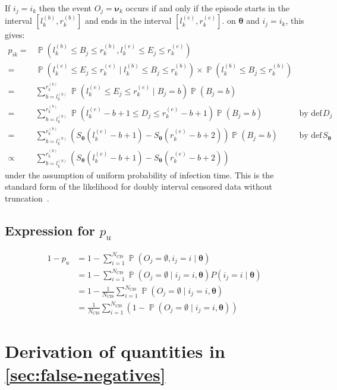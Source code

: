 \documentclass[12pt]{article}
\DeclareMathOperator{\prob}{\mathbb{P}}
\renewcommand{\vec}[1]{\bm{#1}}
\newcommand{\Ncis}{N_\text{CIS}}
\begin{document}
If $i_j = i_k$ then the event $O_j = \vec{\nu}_k$ occurs if and only if the episode starts in the interval $[l^{(b)}_k, r^{(b)}_k]$ and ends in the interval $[l^{(e)}_k, r^{(e)}_k]$.
 on $\vec{\theta}$ and $i_j = i_k$, this gives:
\begin{align}
p_{ik}
=& \prob \left( l_k^{(b)} \leq B_{j} \leq r_k^{(b)}, l_k^{(e)} \leq E_{j} \leq r_k^{(e)} \right) \\
=& \prob \left( l_k^{(e)} \leq E_{j} \leq r_k^{(e)} \mid l_k^{(b)} \leq B_{j} \leq r_k^{(b)} \right) \times\prob \left( l_k^{(b)} \leq B_{j} \leq r_k^{(b)} \right) \\
=& \sum_{b = l_k^{(b)}}^{r_k^{(b)}} \prob \left( l_k^{(e)} \leq E_{j} \leq r_k^{(e)} \mid B_{j} = b \right) \prob \left(B_{j} = b \right) \\
=& \sum_{b = l_k^{(b)}}^{r_k^{(b)}} \prob \left( l_k^{(e)} - b + 1 \leq D_{j} \leq r_k^{(e)} - b + 1 \right) \prob \left(B_{j} = b \right) &\text{by def of $D_{j}$} \\
=& \sum_{b = l_k^{(b)}}^{r_k^{(b)}} \left( S_{\vec{\theta}}(l_k^{(e)} - b + 1) - S_{\vec{\theta}}(r_k^{(e)} - b + 2) \right) \prob \left(B_{j} = b \right) &\text{by def of $S_{\vec{\theta}}$} \\
\propto& \sum_{b = l_k^{(b)}}^{r_k^{(b)}} \left( S_{\vec{\theta}}(l_k^{(e)} - b + 1) - S_{\vec{\theta}}(r_k^{(e)} - b + 2) \right)
\label{perf-test:eq:pia}
\end{align}
under the assumption of uniform probability of infection time.
This is the standard form of the likelihood for doubly interval censored data without truncation~\citep[e.g.][]{sunEmpirical}.

\subsection{Expression for $p_{u}$}

\begin{align}
  1 - p_u
  &= 1 - \sum_{i=1}^{\Ncis} \prob(O_j = \emptyset, i_j = i \mid \vec{\theta}) \\
  &= 1 - \sum_{i=1}^{\Ncis} \prob(O_j = \emptyset \mid i_j = i, \vec{\theta}) P(i_j = i \mid \vec{\theta}) \\
  &= 1 - \frac{1}{\Ncis}\sum_{i=1}^{\Ncis} \prob(O_j = \emptyset \mid i_j = i, \vec{\theta}) \\
  &= \frac{1}{\Ncis} \sum_{i=1}^{\Ncis} (1 - \prob(O_j = \emptyset \mid i_j = i, \vec{\theta}))
\end{align}

\section{Derivation of quantities in \cref{sec:false-negatives}}
\end{document}
